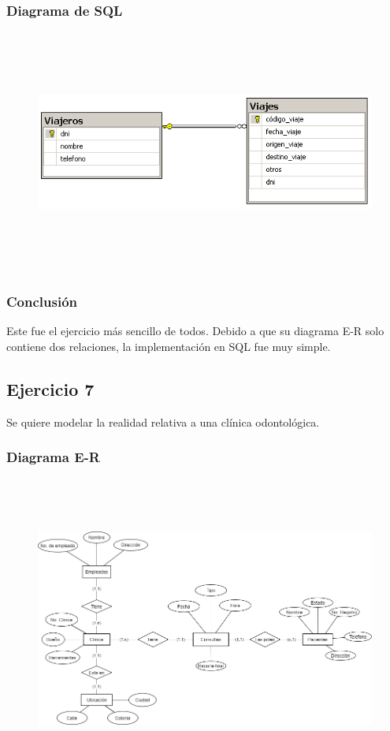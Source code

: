 \documentclass[a4paper, 12pt]{article}
\begin{document}
\begin{justify}
        \subsubsection{Diagrama de SQL}
        \begin{figure}[H]
            \centering
            \includegraphics[width=12cm,height=8cm]{sql6.PNG}
        \end{figure}
        \subsubsection{Conclusión}
        \justify
        Este fue el ejercicio más sencillo de todos. Debido a que su diagrama E-R solo contiene dos relaciones, la implementación en SQL fue muy simple.
        \subsection{Ejercicio 7}
        \justify
        Se quiere modelar la realidad relativa a una clínica odontológica.
        \subsubsection{Diagrama E-R}
        \begin{figure}[H]
            \centering
            \includegraphics[width=16cm,height=10cm]{er7.png}
        \end{figure}

\end{justify}
\end{document}
